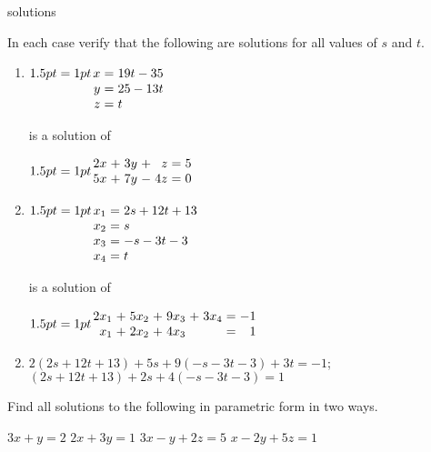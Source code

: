 \begin{Filesave}{solutions}
\end{Filesave}

\begin{multicols}{2}
\begin{ex}
In each case verify that the following are solutions for all values of $s$ and $t$.

\begin{enumerate}[label={\alph*.}]
\item 
$\arraycolsep=1pt
\begin{array}[t]{rcl}
	x &=& 19t - 35 \\
	y &=& 25 - 13t \\
	z &=& t
\end{array}$

is a solution of

$\arraycolsep=1pt
\begin{array}{rlrlrcr}
	2x &+ & 3y & + &  z & = & 5 \\
	5x &+ & 7y & - & 4z & = & 0
\end{array}$
\item 
$\arraycolsep=1pt
\begin{array}[t]{rcl}
	x_1 &=& 2s + 12t + 13\\
	x_2 &=& s \\
	x_3 &=& -s - 3t - 3\\
	x_4 &=& t
\end{array}$

is a solution of

$\arraycolsep=1pt
\begin{array}{rlrlrlrcr}
	2x_1 & + & 5x_2 & + & 9x_3 & + & 3x_4 & = & -1 \\
	 x_1 & + & 2x_2 & + & 4x_3 &   &      & = & 1
\end{array}$
\end{enumerate}

\begin{sol}
\begin{enumerate}[label={\alph*.}]
\setcounter{enumi}{1}
\item  $2(2s + 12t + 13) + 5s + 9(-s - 3t - 3) + 3t = -1$; $(2s + 12t + 13) + 2s + 4(-s - 3t - 3) = 1$

\end{enumerate}
\end{sol}
\end{ex}

\begin{ex}
Find all solutions to the following in parametric form in two ways.
\begin{exenumerate}
\exitem $3x + y = 2$
\exitem $2x + 3y = 1$
\exitem $3x - y + 2z = 5$
\exitem $x - 2y + 5z = 1$
\end{exenumerate}


\end{ex}
\end{multicols}
